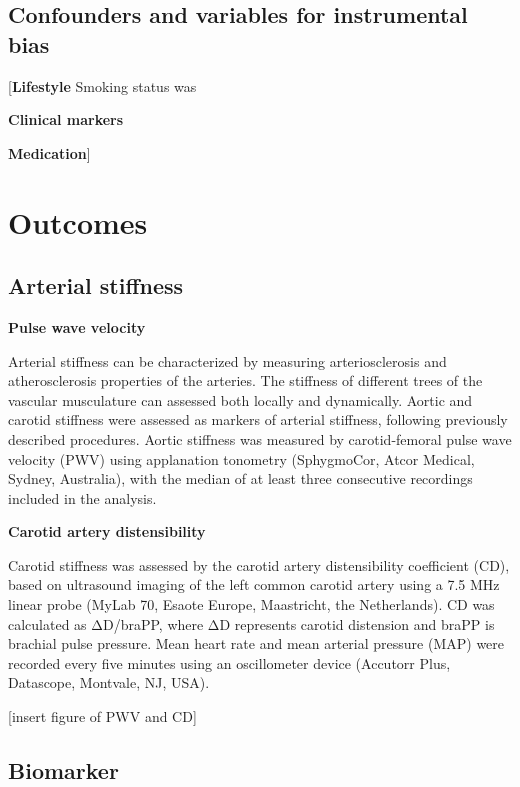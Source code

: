 \documentclass[
  a4paper,
  headsepline=true,
  open=any]{scrbook}
\begin{document}
\hypertarget{confounders-and-variables-for-instrumental-bias}{%
\subsection{Confounders and variables for instrumental
bias}\label{confounders-and-variables-for-instrumental-bias}}

{[}\textbf{Lifestyle} Smoking status was

\textbf{Clinical markers}

\textbf{Medication}{]}

\hypertarget{outcomes}{%
\section{Outcomes}\label{outcomes}}

\hypertarget{arterial-stiffness}{%
\subsection{Arterial stiffness}\label{arterial-stiffness}}

\textbf{Pulse wave velocity}

Arterial stiffness can be characterized by measuring arteriosclerosis
and atherosclerosis properties of the arteries. The stiffness of
different trees of the vascular musculature can assessed both locally
and dynamically. Aortic and carotid stiffness were assessed as markers
of arterial stiffness, following previously described procedures. Aortic
stiffness was measured by carotid-femoral pulse wave velocity (PWV)
using applanation tonometry (SphygmoCor, Atcor Medical, Sydney,
Australia), with the median of at least three consecutive recordings
included in the analysis.

\textbf{Carotid artery distensibility}

Carotid stiffness was assessed by the carotid artery distensibility
coefficient (CD), based on ultrasound imaging of the left common carotid
artery using a 7.5 MHz linear probe (MyLab 70, Esaote Europe,
Maastricht, the Netherlands). CD was calculated as ΔD/braPP, where ΔD
represents carotid distension and braPP is brachial pulse pressure. Mean
heart rate and mean arterial pressure (MAP) were recorded every five
minutes using an oscillometer device (Accutorr Plus, Datascope,
Montvale, NJ, USA).

{[}insert figure of PWV and CD{]}

\hypertarget{biomarker}{%
\subsection{Biomarker}\label{biomarker}}
\end{document}
